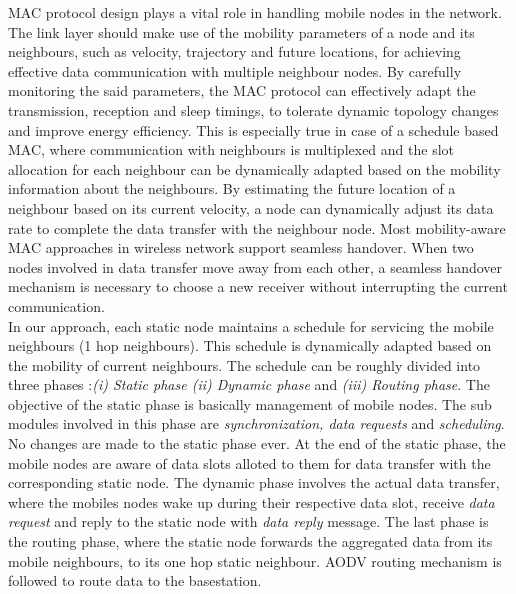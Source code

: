 \documentclass[a4paper, conference, 10pt]{IEEEtran}
\begin{document}
MAC protocol design plays a vital role in handling mobile nodes in the network. {\color{red} The link layer should make use of the mobility parameters of a node and its neighbours, such as velocity, trajectory and future locations, for achieving effective data communication with multiple neighbour nodes.} By carefully monitoring the said parameters, the MAC protocol can effectively adapt the transmission, reception and sleep timings, to tolerate dynamic topology changes and improve energy efficiency. This is especially true in case of a schedule based MAC, where communication with neighbours is multiplexed and the slot allocation for each neighbour can be dynamically adapted based on the mobility information about the neighbours. By estimating the future location of a neighbour based on its current velocity, a node can dynamically adjust its data rate to complete the data transfer with the neighbour node. { \color{red} Most mobility-aware MAC approaches in wireless network support seamless handover.} When two nodes involved in data transfer move away from each other, a seamless handover mechanism is necessary to choose a new receiver without interrupting the current communication.\\

In our approach, each static node maintains a schedule for servicing the mobile neighbours (1 hop neighbours). This schedule is dynamically adapted based on the mobility of current neighbours. The schedule can be roughly divided into three phases :\emph{(i) Static phase (ii) Dynamic phase} and \emph{(iii) Routing phase}. The objective of the static phase is basically management of mobile nodes. The sub modules involved in this phase are \emph{synchronization, data requests} and \emph{scheduling}.{\color{red} No changes are made to the static phase ever.} At the end of the static phase, the mobile nodes are aware of data slots alloted to them for data transfer with the corresponding static node. The dynamic phase involves the actual data transfer, where the mobiles nodes wake up during their respective data slot, receive \emph{data request} and reply to the static node with \emph{data reply} message. The last phase is the routing phase, where the static node forwards the aggregated data from its mobile neighbours, to its one hop static neighbour. AODV routing mechanism \cite{aodv} is followed to route data to the basestation.\\\\
\end{document}
